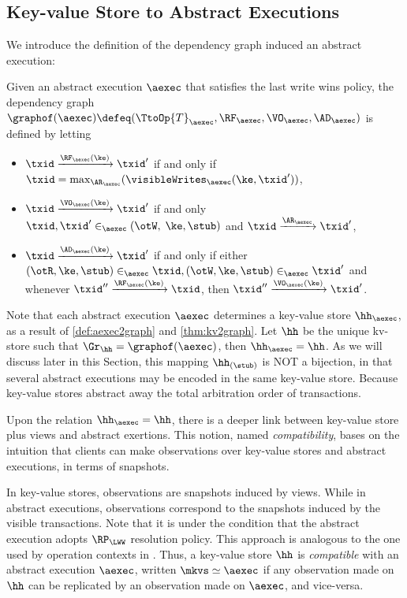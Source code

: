 \subsection{Key-value Store to Abstract Executions}
\label{app:aexec2kv}
\label{sec:thm:aexec2kv-compatible-proof}

We introduce the definition of the dependency graph induced an abstract execution:

\begin{definition}
\label{def:aexec2graph}
Given an abstract execution $\aexec$ that satisfies the last write wins policy,
the dependency graph $\graphof(\aexec) \defeq (\TtoOp{T}_{\aexec}, \RF_{\aexec}, 
\VO_{\aexec}, \AD_{\aexec})$ is defined by letting
\begin{itemize}
\item $\txid \xrightarrow{\RF_{\aexec}(\ke)} \txid'$ if and only if 
$\txid = \max_{\AR_{\aexec}}(\visibleWrites_{\aexec}(\ke, \txid'))$, 
\item $\txid \xrightarrow{\VO_{\aexec}(\ke)} \txid'$ if and only 
$\txid, \txid' \in_{\aexec} (\otW, \;\ke, \stub)$ 
and $\txid \xrightarrow{\AR_{\aexec}} \txid'$,
\item $\txid \xrightarrow{\AD_{\aexec}(\ke)} \txid'$ if and only if either 
$(\otR, \ke, \stub) \in_{\aexec} \txid, (\otW, \ke, \stub) \in_{\aexec} \txid'$ and 
whenever $\txid'' \xrightarrow{\RF_{\aexec}(\ke)} \txid$, 
then $\txid'' \xrightarrow{\VO_{\aexec}(\ke)} \txid'$.
\end{itemize}
\end{definition}

Note that each abstract execution $\aexec$ determines a key-value store $\hh_{\aexec}$,
as a result of \cref{def:aexec2graph} and \cref{thm:kv2graph}. 
Let $\hh$ be the unique kv-store such that $\Gr_{\hh} = \graphof(\aexec)$, then $\hh_{\aexec} = \hh$. 
As we will discuss later in this Section,
this mapping $\hh_{(\stub)}$ is NOT a bijection, 
in that several abstract executions may be encoded in the same key-value store.
Because key-value stores abstract away the total arbitration order of transactions.

Upon the relation \( \hh_{\aexec} = \hh \),
there is a deeper link between key-value store plus views and abstract exertions.
This notion, named \emph{compatibility}, bases on the intuition that 
clients can make observations over key-value stores and abstract executions, in terms of snapshots.

In key-value stores, observations are snapshots induced by views. 
While in abstract executions, observations correspond to the snapshots induced by the visible transactions.
Note that it is under the condition that the abstract execution adopts $\RP_{\LWW}$ resolution policy.
This approach is analogous to the one used by operation contexts in \cite{repldatatypes}.
Thus, a key-value store $\hh$ is \emph{compatible} with an abstract execution $\aexec$, written \( \mkvs \simeq \aexec \)
if any observation made on $\hh$ can be replicated by an observation made on $\aexec$, and vice-versa. 

